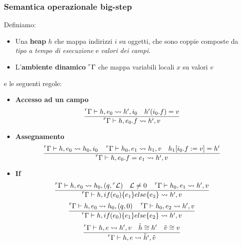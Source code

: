 \subsubsection{Semantica operazionale big-step}
Definiamo:
\begin{itemize}
	\item Una \textbf{heap} $h$ che mappa indirizzi $i$ su oggetti, che sono coppie composte da \textit{tipo a tempo di esecuzione} e \textit{valori dei campi}.
	\item L'\textbf{ambiente dinamico} $\prescript{r}{}{\Gamma}$ che mappa variabili locali $x$ su valori $v$
\end{itemize}
e le seguenti regole:
\begin{itemize}
	\item \textbf{Accesso ad un campo}
	\begin{equation}
		\frac{\prescript{r}{}{\Gamma} \vdash h, e_0 \rightsquigarrow h', i_0 \quad h'(i_0.f)=v}{\prescript{r}{}{\Gamma} \vdash h, e_0.f \rightsquigarrow h', v}
	\end{equation}
	\item \textbf{Assegnamento}
	\begin{equation}
		\frac{\prescript{r}{}{\Gamma} \vdash h, e_0 \rightsquigarrow h_0, i_0 \quad \prescript{r}{}{\Gamma} \vdash h_0, e_1 \rightsquigarrow h_1, v \quad h_1[i_0.f := v] = h'}{\prescript{r}{}{\Gamma} \vdash h, e_0.f  = e_1\rightsquigarrow h', v}
	\end{equation}
	\item \textbf{If}
	\begin{equation}
		\frac{\prescript{r}{}{\Gamma} \vdash h, e_0 \rightsquigarrow h_0, (q, \prescript{r}{}{\mathcal{L}}) \quad \mathcal{L} \neq 0 \quad \prescript{r}{}{\Gamma} \vdash h_0, e_1 \rightsquigarrow h', v}{\prescript{r}{}{\Gamma} \vdash h, if(e_0)\{e_1\}else\{e_2\} \rightsquigarrow h', v}
	\end{equation}
	\begin{equation}
		\frac{\prescript{r}{}{\Gamma} \vdash h, e_0 \rightsquigarrow h_0, (q, 0) \quad \prescript{r}{}{\Gamma} \vdash h_0, e_2 \rightsquigarrow h', v}{\prescript{r}{}{\Gamma} \vdash h, if(e_0)\{e_1\}else\{e_2\} \rightsquigarrow h', v}
	\end{equation} 
	\begin{equation}
		\frac{\prescript{r}{}{\Gamma} \vdash h, e \rightsquigarrow h', v \quad \tilde{h} \cong h' \quad \tilde{v}\cong v}{\prescript{r}{}{\Gamma} \vdash h,e \rightsquigarrow \tilde{h}', \tilde{v}}
	\end{equation}
\end{itemize}

